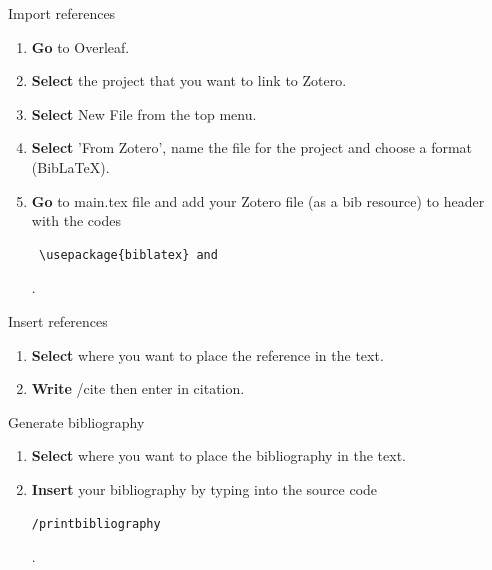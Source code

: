 \documentclass[10pt,a4paper]{article}
\begin{document}
 
 \begin{textbox}{Import references}
 

  

\begin{enumerate}
\item \textbf {Go} to Overleaf. 
\item \textbf {Select} the project that you want to link to Zotero.
\item \textbf {Select} New File from the top menu.
\item \textbf {Select} 'From Zotero', name the file for the project and choose a format (BibLaTeX).
\item \textbf {Go} to main.tex file and add your Zotero file (as a bib resource) to header with the codes \begin{verbatim} \usepackage{biblatex} and \end{verbatim}.
\end{enumerate}

\end{textbox}

  

  \begin{textbox}{Insert references}
 

  

\begin{enumerate}
\item \textbf {Select} where you want to place the reference in the text.
\item \textbf {Write} /cite{} then enter in citation.
\end{enumerate}

\end{textbox}

  

 \begin{textbox}{Generate bibliography}
 

  

\begin{enumerate}
\item \textbf {Select} where you want to place the bibliography in the text.
\item \textbf{Insert} your bibliography by typing into the source code \begin{verbatim}/printbibliography\end{verbatim}.
\end{enumerate}

\end{textbox}
\end{document}
